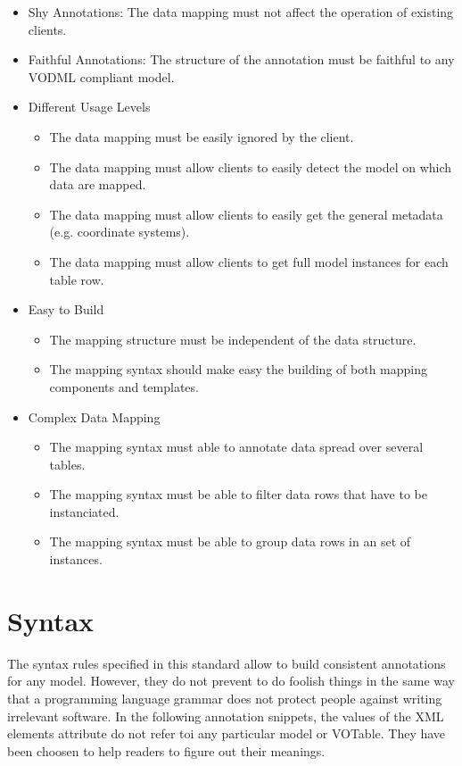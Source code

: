 \documentclass[11pt,a4paper]{ivoa}
\begin{document}
\begin{itemize}
\item Shy Annotations: The data mapping must not affect the operation of existing clients.

\item Faithful Annotations: The structure of the annotation must be faithful to any VODML compliant model. 


\item Different Usage Levels 
\begin{itemize}
   \item The data mapping must be easily ignored by the client.
   \item The data mapping must allow clients to easily detect the model on which data are mapped.
   \item The data mapping must allow clients to easily get the general metadata (e.g. coordinate systems).
   \item The data mapping must allow clients to get full model instances for each table row.
\end{itemize}

\item Easy to Build 
\begin{itemize}
   \item The mapping structure must be independent of the data structure.
   \item The mapping syntax should make easy the building of both mapping components and templates.
\end{itemize}

\item Complex Data Mapping 
\begin{itemize}
   \item The mapping syntax must able to annotate data spread over several tables.
   \item The mapping syntax must be able to filter data rows that have to be instanciated.
   \item The mapping syntax must be able to group data rows in an set of instances.
\end{itemize}
\end{itemize}


\section{Syntax}


The syntax rules specified in this standard allow to build consistent annotations for any model. However, they do not prevent to do foolish things in the same way that a programming language grammar does not protect people against writing irrelevant software.
In the following annotation snippets, the values of the XML elements attribute do not refer toi any particular model or VOTable. They have been choosen to help readers to figure out their meanings.
\end{document}
